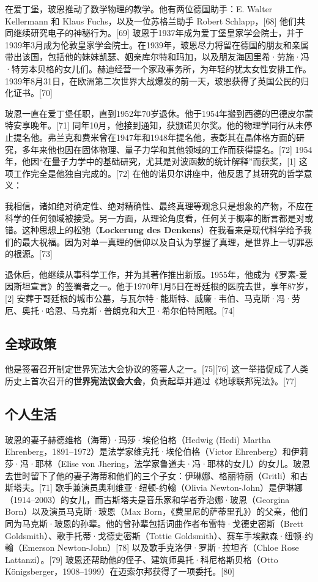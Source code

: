 在爱丁堡，玻恩推动了数学物理的教学。他有两位德国助手：E. Walter Kellermann 和 Klaus Fuchs，以及一位苏格兰助手 Robert Schlapp，[68] 他们共同继续研究电子的神秘行为。[69] 玻恩于1937年成为爱丁堡皇家学会院士，并于1939年3月成为伦敦皇家学会院士。在1939年，玻恩尽力将留在德国的朋友和亲属带出该国，包括他的妹妹凯瑟、姻亲库尔特和玛加，以及朋友海因里希·劳施·冯·特劳本贝格的女儿们。赫迪经营一个家政事务所，为年轻的犹太女性安排工作。1939年8月31日，在欧洲第二次世界大战爆发的前一天，玻恩获得了英国公民的归化证书。[70]

玻恩一直在爱丁堡任职，直到1952年70岁退休。他于1954年搬到西德的巴德皮尔蒙特安享晚年。[71] 同年10月，他接到通知，获颁诺贝尔奖。他的物理学同行从未停止提名他。弗兰克和费米曾在1947年和1948年提名他，表彰其在晶体格方面的研究，多年来他也因在固体物理、量子力学和其他领域的工作而获得提名。[72] 1954年，他因“在量子力学中的基础研究，尤其是对波函数的统计解释”而获奖，[1] 这项工作完全是他独自完成的。[72] 在他的诺贝尔讲座中，他反思了其研究的哲学意义：  

我相信，诸如绝对确定性、绝对精确性、最终真理等观念只是想象的产物，不应在科学的任何领域被接受。另一方面，从理论角度看，任何关于概率的断言都是对或错。这种思想上的松弛（\textbf{Lockerung des Denkens}）在我看来是现代科学给予我们的最大祝福。因为对单一真理的信仰以及自认为掌握了真理，是世界上一切罪恶的根源。[73]

退休后，他继续从事科学工作，并为其著作推出新版。1955年，他成为《罗素-爱因斯坦宣言》的签署者之一。他于1970年1月5日在哥廷根的医院去世，享年87岁，[2] 安葬于哥廷根的城市公墓，与瓦尔特·能斯特、威廉·韦伯、马克斯·冯·劳厄、奥托·哈恩、马克斯·普朗克和大卫·希尔伯特同眠。[74]
\subsection{全球政策}  
他是签署召开制定世界宪法大会协议的签署人之一。[75][76] 这一举措促成了人类历史上首次召开的\textbf{世界宪法议会大会}，负责起草并通过《地球联邦宪法》。[77]
\subsection{个人生活}  
玻恩的妻子赫德维格（海蒂）·玛莎·埃伦伯格（Hedwig (Hedi) Martha Ehrenberg，1891–1972）是法学家维克托·埃伦伯格（Victor Ehrenberg）和伊莉莎·冯·耶林（Elise von Jhering，法学家鲁道夫·冯·耶林的女儿）的女儿。玻恩去世时留下了他的妻子海蒂和他们的三个子女：伊琳娜、格丽特丽（Gritli）和古斯塔夫。[71] 歌手兼演员奥利维亚·纽顿-约翰（Olivia Newton-John）是伊琳娜（1914–2003）的女儿，而古斯塔夫是音乐家和学者乔治娜·玻恩（Georgina Born）以及演员马克斯·玻恩（Max Born，《费里尼的萨蒂里孔》）的父亲，他们同为马克斯·玻恩的孙辈。他的曾孙辈包括词曲作者布雷特·戈德史密斯（Brett Goldsmith）、歌手托蒂·戈德史密斯（Tottie Goldsmith）、赛车手埃默森·纽顿-约翰（Emerson Newton-John）[78] 以及歌手克洛伊·罗斯·拉坦齐（Chloe Rose Lattanzi）。[79] 玻恩还帮助他的侄子、建筑师奥托·科尼格斯贝格（Otto Königsberger，1908–1999）在迈索尔邦获得了一项委托。[80]
